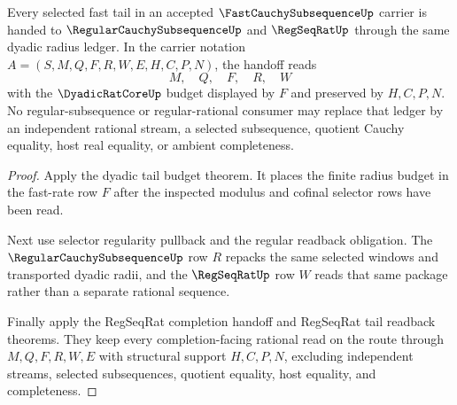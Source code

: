 \begin{theorem}
\label{thm:fast-cauchy-subsequence-regular-subsequence-handoff-totality}
Every selected fast tail in an accepted $\FastCauchySubsequenceUp$ carrier is handed to $\RegularCauchySubsequenceUp$ and $\RegSeqRatUp$ through the same dyadic radius ledger. In the carrier notation $A=(S,M,Q,F,R,W,E,H,C,P,N)$, the handoff reads
$$
M,\quad Q,\quad F,\quad R,\quad W
$$
with the $\DyadicRatCoreUp$ budget displayed by $F$ and preserved by $H,C,P,N$. No regular-subsequence or regular-rational consumer may replace that ledger by an independent rational stream, a selected subsequence, quotient Cauchy equality, host real equality, or ambient completeness.
\end{theorem}
\begin{proof}
Apply the dyadic tail budget theorem. It places the finite radius budget in the fast-rate row $F$ after the inspected modulus and cofinal selector rows have been read.

Next use selector regularity pullback and the regular readback obligation. The $\RegularCauchySubsequenceUp$ row $R$ repacks the same selected windows and transported dyadic radii, and the $\RegSeqRatUp$ row $W$ reads that same package rather than a separate rational sequence.

Finally apply the RegSeqRat completion handoff and RegSeqRat tail readback theorems. They keep every completion-facing rational read on the route through $M,Q,F,R,W,E$ with structural support $H,C,P,N$, excluding independent streams, selected subsequences, quotient equality, host equality, and completeness.
\end{proof}

